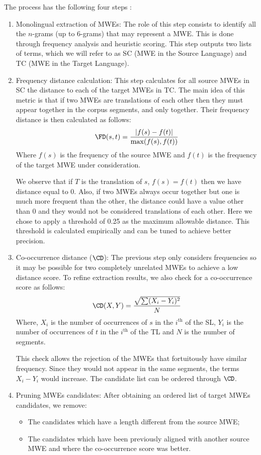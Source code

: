 \documentclass[output=paper,modfonts,nonflat]{langsci/langscibook}
\begin{document}
The  process has the following four steps \citep{semmar2010hybrid}:
\begin{enumerate}
 \item Monolingual extraction of MWEs: The role of this step consists to identify all the $n$-grams (up to 6-grams) that may represent a MWE. This is done through frequency analysis and heuristic scoring. This step outputs two lists of terms, which we will refer to as SC (MWE in the Source Language) and TC (MWE in the Target Language).
 \item Frequency distance calculation: This step calculates for all source MWEs in SC the distance to each of the target MWEs in TC. The main idea of this metric is that if two MWEs are translations of each other then they must appear together in the corpus segments, and only together. Their frequency distance is then calculated as follows:
 \begin{equation}
  \FD(s,t)=\frac{|f(s)-f(t)|}{\max(f(s),f(t))}
 \end{equation}
 Where $f(s)$ is the frequency of the source MWE and $f(t)$ is the frequency of the target MWE under consideration.

We observe that if $T$ is the translation of $s$, $f(s) = f(t) $ then we have distance equal to 0. 
Also, if two MWEs always occur together but one is much more frequent than the other, the distance could have a value other than 0 and they would not be considered translations of each other. 
Here we chose to apply a threshold of 0.25 as the maximum allowable distance. This threshold is calculated empirically and can be tuned to achieve better precision.

\item Co-occurrence distance ($\CD$): The previous step only considers frequencies so it may be possible for two completely unrelated MWEs to achieve a low distance score. To refine extraction results, we also check for a co-occurrence score as follows:
\begin{equation}
  \CD(X,Y)=\frac{\sqrt{\sum(X_i-Y_i)^2}}{N}
\end{equation}
Where, $X_i$ is the number of occurrences of $s$ in the $i^{\text{th}}$  of the SL, $Y_i$ is the number of occurrences of $t$ in the $i^{\text{th}}$  of the TL and $N$ is the number of segments.

This check allows the rejection of the MWEs that fortuitously have similar frequency. Since they would not appear in the same segments, the terms $X_i-Y_i$ would increase. The candidate list can be ordered through $\CD$.

\item Pruning MWEs candidates: After obtaining an ordered list of target MWEs candidates, we remove:
\begin{itemize}
 \item The candidates which have a length different from the source MWE;
 \item The candidates which have been previously aligned with another source MWE and where the co-occurrence score was better.
\end{itemize}
\end{enumerate}
\end{document}
